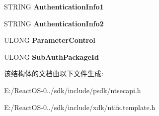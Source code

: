 \begin{DoxyCompactItemize}
\mbox{\label{struct___m_s_v1__0___s_u_b_a_u_t_h___l_o_g_o_n_afb1aa072a57b3584ad252071acbb0aad}} 
S\+T\+R\+I\+NG {\bfseries Authentication\+Info1}
\item 
\mbox{\label{struct___m_s_v1__0___s_u_b_a_u_t_h___l_o_g_o_n_a5dbce39e5caff58db40447d0687bac84}} 
S\+T\+R\+I\+NG {\bfseries Authentication\+Info2}
\item 
\mbox{\label{struct___m_s_v1__0___s_u_b_a_u_t_h___l_o_g_o_n_aa45efb3867ba1bfd2e2cf6778dd5b4e5}} 
U\+L\+O\+NG {\bfseries Parameter\+Control}
\item 
\mbox{\label{struct___m_s_v1__0___s_u_b_a_u_t_h___l_o_g_o_n_ac10bb1040d69d881a622c1df83bc4619}} 
U\+L\+O\+NG {\bfseries Sub\+Auth\+Package\+Id}
\end{DoxyCompactItemize}


该结构体的文档由以下文件生成\+:\begin{DoxyCompactItemize}
\item 
E\+:/\+React\+O\+S-\/0../sdk/include/psdk/ntsecapi.\+h\item 
E\+:/\+React\+O\+S-\/0../sdk/include/xdk/ntifs.\+template.\+h\end{DoxyCompactItemize}
